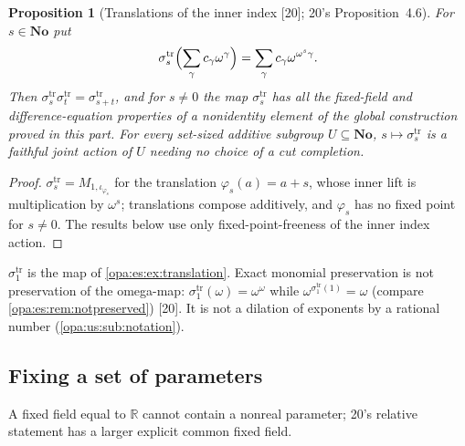 \documentclass[11pt,oneside]{article}
\numberwithin{equation}{section}
\newtheorem{proposition}[proposition]{Proposition}
\theoremstyle{definition}
\theoremstyle{remark}
\newcommand{\No}{\mathbf{No}}
\newcommand{\R}{\mathbb R}
\newcommand{\src}[1]{\textup{\textsf{\small[#1]}}}
\begin{document}
\begin{proposition}[Translations of the inner index \src{20}; 20's Proposition~4.6]\label{opa:us:prop:translations}
For $s\in\No$ put
\begin{equation}\label{opa:us:eq:translation}
 \sigma^{\mathrm{tr}}_s\Bigl(\sum_\gamma c_\gamma\omega^\gamma\Bigr)=\sum_\gamma c_\gamma\omega^{\omega^s\gamma}.
\end{equation}
Then $\sigma^{\mathrm{tr}}_s\sigma^{\mathrm{tr}}_t=\sigma^{\mathrm{tr}}_{s+t}$, and for $s\ne0$ the map $\sigma^{\mathrm{tr}}_s$ has all the fixed-field and
difference-equation properties of a nonidentity element of the global construction proved in this part. For every set-sized additive
subgroup $U\subseteq\No$, $s\mapsto\sigma^{\mathrm{tr}}_s$ is a faithful joint action of $U$ needing no choice of a cut completion.
\end{proposition}
\begin{proof}
$\sigma^{\mathrm{tr}}_s=M_{1,\iota_{\varphi_s}}$ for the translation $\varphi_s(a)=a+s$, whose inner lift is multiplication by $\omega^s$; translations
compose additively, and $\varphi_s$ has no fixed point for $s\ne0$. The results below use only fixed-point-freeness of the inner index
action.
\end{proof}

$\sigma^{\mathrm{tr}}_1$ is the map of \cref{opa:es:ex:translation}. Exact monomial preservation is not preservation of the omega-map:
$\sigma^{\mathrm{tr}}_1(\omega)=\omega^\omega$ while $\omega^{\sigma^{\mathrm{tr}}_1(1)}=\omega$ (compare \cref{opa:es:rem:notpreserved}) \src{20}. It is not a
dilation of exponents by a rational number (\cref{opa:us:sub:notation}).

\subsection{Fixing a set of parameters}

A fixed field equal to $\R$ cannot contain a nonreal parameter; 20's relative statement has a larger explicit common fixed field.
\end{document}
